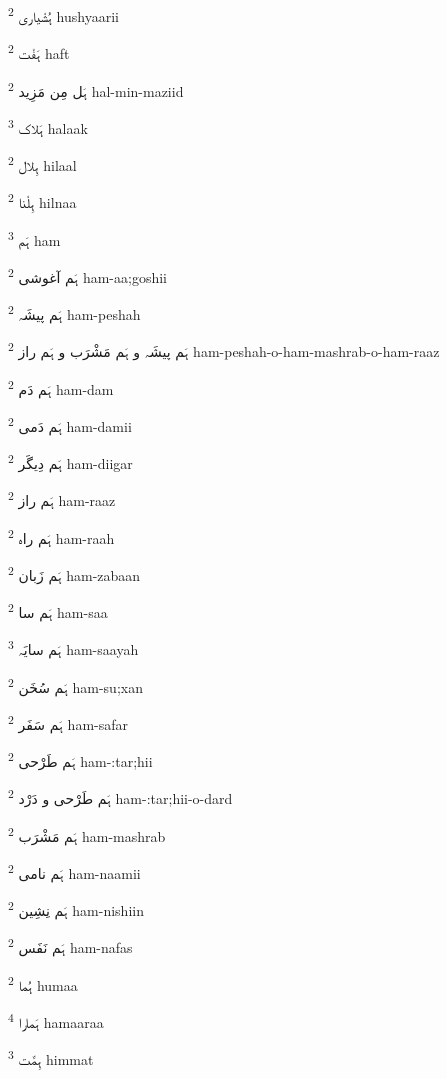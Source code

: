 \documentclass[12pt]{article}
\begin{document}
\begin{multicols}{5}
{\ur ہُشْیاری}   \textsuperscript{2} hushyaarii

{\ur ہَفْت}   \textsuperscript{2} haft

{\ur ہَل مِن مَزِید}   \textsuperscript{2} hal-min-maziid

{\ur ہَلاک}   \textsuperscript{3} halaak

{\ur ہِلال}   \textsuperscript{2} hilaal

{\ur ہِلْنا}   \textsuperscript{2} hilnaa

{\ur ہَم}   \textsuperscript{3} ham

{\ur ہَم آغوشی}   \textsuperscript{2} ham-aa;goshii

{\ur ہَم پیشَہ}   \textsuperscript{2} ham-peshah

{\ur ہَم پیشَہ و ہَم مَشْرَب و ہَم راز}   \textsuperscript{2} ham-peshah-o-ham-mashrab-o-ham-raaz

{\ur ہَم دَم}   \textsuperscript{2} ham-dam

{\ur ہَم دَمی}   \textsuperscript{2} ham-damii

{\ur ہَم دِیگَر}   \textsuperscript{2} ham-diigar

{\ur ہَم راز}   \textsuperscript{2} ham-raaz

{\ur ہَم راہ}   \textsuperscript{2} ham-raah

{\ur ہَم زَبان}   \textsuperscript{2} ham-zabaan

{\ur ہَم سا}   \textsuperscript{2} ham-saa

{\ur ہَم سایَہ}   \textsuperscript{3} ham-saayah

{\ur ہَم سُخَن}   \textsuperscript{2} ham-su;xan

{\ur ہَم سَفَر}   \textsuperscript{2} ham-safar

{\ur ہَم طَرْحی}   \textsuperscript{2} ham-:tar;hii

{\ur ہَم طَرْحی و دَرْد}   \textsuperscript{2} ham-:tar;hii-o-dard

{\ur ہَم مَشْرَب}   \textsuperscript{2} ham-mashrab

{\ur ہَم نامی}   \textsuperscript{2} ham-naamii

{\ur ہَم نِشِین}   \textsuperscript{2} ham-nishiin

{\ur ہَم نَفَس}   \textsuperscript{2} ham-nafas

{\ur ہُما}   \textsuperscript{2} humaa

{\ur ہَمارا}   \textsuperscript{4} hamaaraa

{\ur ہِمَّت}   \textsuperscript{3} himmat


\end{multicols}
\end{document}
